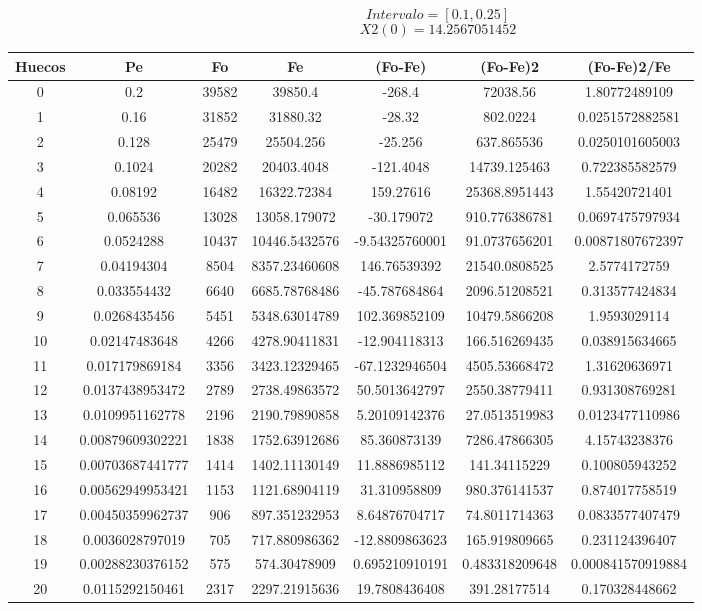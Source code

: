 \documentclass{article}
\begin{document}
$$
Intervalo = [0.1, 0.25]
$$
$$
X2(0) = 14.2567051452
$$
\begin{tabular}{|c|c|c|c|c|c|c|}
Huecos&Pe&Fo&Fe&(Fo{-}Fe)&(Fo{-}Fe)2&(Fo{-}Fe)2/Fe\\
\hline
0&0.2&39582&39850.4&{-}268.4&72038.56&1.80772489109\\
\hline
1&0.16&31852&31880.32&{-}28.32&802.0224&0.0251572882581\\
\hline
2&0.128&25479&25504.256&{-}25.256&637.865536&0.0250101605003\\
\hline
3&0.1024&20282&20403.4048&{-}121.4048&14739.125463&0.722385582579\\
\hline
4&0.08192&16482&16322.72384&159.27616&25368.8951443&1.55420721401\\
\hline
5&0.065536&13028&13058.179072&{-}30.179072&910.776386781&0.0697475797934\\
\hline
6&0.0524288&10437&10446.5432576&{-}9.54325760001&91.0737656201&0.00871807672397\\
\hline
7&0.04194304&8504&8357.23460608&146.76539392&21540.0808525&2.5774172759\\
\hline
8&0.033554432&6640&6685.78768486&{-}45.787684864&2096.51208521&0.313577424834\\
\hline
9&0.0268435456&5451&5348.63014789&102.369852109&10479.5866208&1.9593029114\\
\hline
10&0.02147483648&4266&4278.90411831&{-}12.904118313&166.516269435&0.038915634665\\
\hline
11&0.017179869184&3356&3423.12329465&{-}67.1232946504&4505.53668472&1.31620636971\\
\hline
12&0.0137438953472&2789&2738.49863572&50.5013642797&2550.38779411&0.931308769281\\
\hline
13&0.0109951162778&2196&2190.79890858&5.20109142376&27.0513519983&0.0123477110986\\
\hline
14&0.00879609302221&1838&1752.63912686&85.360873139&7286.47866305&4.15743238376\\
\hline
15&0.00703687441777&1414&1402.11130149&11.8886985112&141.34115229&0.100805943252\\
\hline
16&0.00562949953421&1153&1121.68904119&31.310958809&980.376141537&0.874017758519\\
\hline
17&0.00450359962737&906&897.351232953&8.64876704717&74.8011714363&0.0833577407479\\
\hline
18&0.0036028797019&705&717.880986362&{-}12.8809863623&165.919809665&0.231124396407\\
\hline
19&0.00288230376152&575&574.30478909&0.695210910191&0.483318209648&0.000841570919884\\
\hline
20&0.0115292150461&2317&2297.21915636&19.7808436408&391.28177514&0.170328448662\\
\end{tabular}
\end{document}
